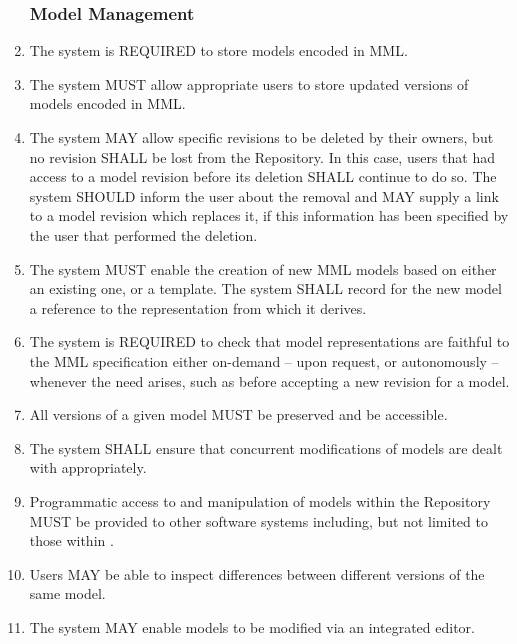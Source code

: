 \begin{enumerate}[1]
\subsubsection{Model Management}
\item The system is REQUIRED to store models encoded in \gls{MML}. 

\item The system MUST allow appropriate users to store updated versions of models encoded in MML.

\item The system MAY allow specific revisions to be deleted by their owners, but no revision SHALL be lost from the Repository. In this case, users that had access to a model revision before its deletion SHALL continue to do so. The system SHOULD inform the user about the removal and MAY supply a link to a model revision which replaces it, if this information has been specified by the user that performed the deletion. 

\item The system MUST enable the creation of new MML models based on either an existing one, or a template. The system SHALL record for the new model a reference  to the representation from which it derives.

\item The system is REQUIRED to check that model representations are faithful to the MML specification either on-demand -- upon request, or autonomously -- whenever the need arises, such as before accepting a new revision for a model. 

\item All versions of a given model MUST be preserved and be accessible.

\item The system SHALL ensure that concurrent modifications of models are dealt with appropriately.

\item Programmatic access to and manipulation of models within the Repository MUST be provided to other software systems including, but not limited to those within \ddmore. 

\item Users MAY be able to inspect differences between different versions of the same model.

\item The system MAY enable models to be modified via an integrated editor.


\end{enumerate}
